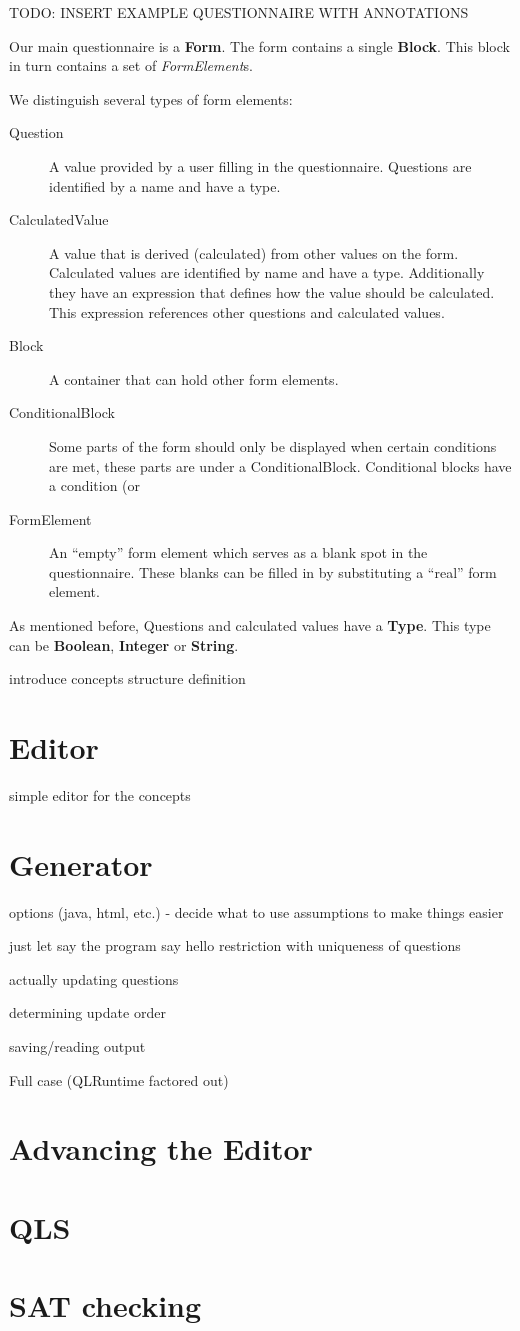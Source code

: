 \documentclass[11pt]{article}
\begin{document}
TODO: INSERT EXAMPLE QUESTIONNAIRE WITH ANNOTATIONS

Our main questionnaire is a \textbf{Form}. The form contains a single \textbf{Block}. This block in turn contains a set of \textit{FormElement}s. 

We distinguish several types of form elements:
\begin{description}
\item[Question] A value provided by a user filling in the questionnaire. Questions are identified by a name and have a type.
\item[CalculatedValue] A value that is derived (calculated) from other values on the form. Calculated values are identified by name and have a type. Additionally they have an expression that defines how the value should be calculated. This expression references other questions and calculated values.
\item[Block] A container that can hold other form elements.
\item[ConditionalBlock] Some parts of the form should only be displayed when certain conditions are met, these parts are under a ConditionalBlock. Conditional blocks have a condition (or 
\item[FormElement] An ``empty'' form element which serves as a blank spot in the questionnaire. These blanks can be filled in by substituting a ``real'' form element.
\end{description}

As mentioned before, Questions and calculated values have a \textbf{Type}. This type can be \textbf{Boolean}, \textbf{Integer} or \textbf{String}.



introduce concepts
structure definition

\section{Editor}
simple editor for the concepts

\section{Generator}
options (java, html, etc.) - decide what to use
assumptions to make things easier

just let say the program say hello
restriction with uniqueness of questions

actually updating questions

determining update order

saving/reading output

Full case (QLRuntime factored out)

\section{Advancing the Editor}

\section{QLS}

\section{SAT checking}
\end{document}
